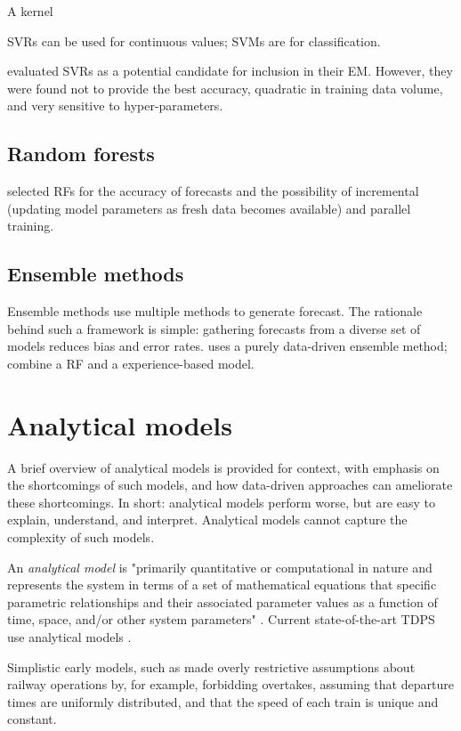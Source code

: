 \documentclass{article}
\begin{document}
A kernel 

SVRs can be used for continuous values; SVMs are for classification.

\cite{nair_et_al_2019} evaluated SVRs as a potential candidate for inclusion in their EM. However, they were found not to provide the best accuracy, quadratic in training data volume, and very sensitive to hyper-parameters.

\subsection{Random forests}

\cite{nair_et_al_2019} selected RFs for the accuracy of forecasts and the possibility of incremental (updating model parameters as fresh data becomes available) and parallel training. 


\subsection{Ensemble methods}

Ensemble methods use multiple methods to generate forecast. The rationale behind such a framework is simple: gathering forecasts from a diverse set of models reduces bias and error rates. \cite{nair_et_al_2019} uses a purely data-driven ensemble method; \cite{oneto_et_al_2018} combine a RF and a experience-based model.

\clearpage
\section{Analytical models}

A brief overview of analytical models is provided for context, with emphasis on the shortcomings of such models, and how data-driven approaches can ameliorate these shortcomings. In short: analytical models
perform worse, but are easy to explain, understand, and interpret. Analytical models cannot capture the complexity of such models. 

An \textit{analytical model} is "primarily quantitative or computational in nature and represents the system in terms of a set of mathematical equations that specific parametric relationships and their associated
parameter values as a function of time, space, and/or other system parameters" \cite{friedenthal_moore_steiner_2012}. Current state-of-the-art TDPS use analytical models \cite{oneto_fumeo_clerico_canepa_papa_dambra_mazzino_anguita_2016}.

Simplistic early models, such as \cite{frank_1966} made overly restrictive assumptions about railway operations by, for example, forbidding overtakes, assuming that departure times are uniformly distributed,
and that the speed of each train is unique and constant. 
\end{document}
